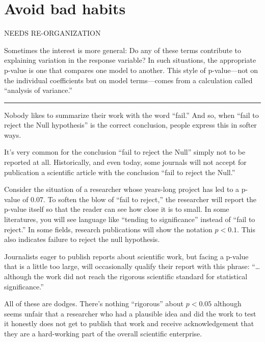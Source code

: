 \documentclass[
  letterpaper,
  DIV=11,
  numbers=noendperiod,
  oneside]{scrreprt}
\newcommand{\Ptest}{\mathbb{P}}
\newcommand{\Ntest}{\mathbb{N}}
\newcommand{\given}{\ |\!\!|\  }
\begin{document}
\[\newcommand{\Ptest}{\mathbb{P}}
\newcommand{\Ntest}{\mathbb{N}}
\newcommand{\given}{\ |\!\!|\  }\]

\hypertarget{avoid-bad-habits}{%
\section{Avoid bad habits}\label{avoid-bad-habits}}

NEEDS RE-ORGANIZATION

Sometimes the interest is more general: Do any of these terms contribute
to explaining variation in the response variable? In such situations,
the appropriate p-value is one that compares one model to another. This
style of p-value---not on the individual coefficients but on model
terms---comes from a calculation called ``analysis of variance.''

\begin{center}\rule{0.5\linewidth}{0.5pt}\end{center}

Nobody likes to summarize their work with the word ``fail.'' And so,
when ``fail to reject the Null hypothesis'' is the correct conclusion,
people express this in softer ways.

It's very common for the conclusion ``fail to reject the Null'' simply
not to be reported at all. Historically, and even today, some journals
will not accept for publication a scientific article with the conclusion
``fail to reject the Null.''

Consider the situation of a researcher whose years-long project has led
to a p-value of 0.07. To soften the blow of ``fail to reject,'' the
researcher will report the p-value itself so that the reader can see how
close it is to small. In some literatures, you will see language like
``tending to significance'' instead of ``fail to reject.'' In some
fields, research publications will show the notation \(p < 0.1\). This
also indicates failure to reject the null hypothesis.

Journalists eager to publish reports about scientific work, but facing a
p-value that is a little too large, will occasionally qualify their
report with this phrase: ``\ldots{} although the work did not reach the
rigorous scientific standard for statistical significance.''

All of these are dodges. There's nothing ``rigorous'' about \(p < 0.05\)
although seems unfair that a researcher who had a plausible idea and did
the work to test it honestly does not get to publish that work and
receive acknowledgement that they are a hard-working part of the overall
scientific enterprise.
\end{document}
